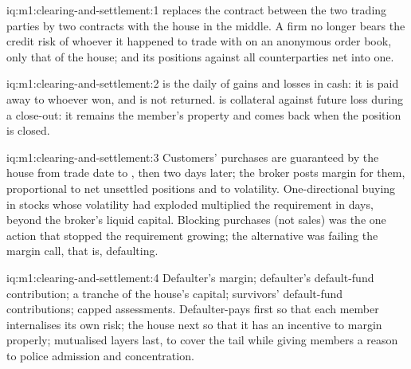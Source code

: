 \begin{solution}{iq:m1:clearing-and-settlement:1}
 replaces the contract between the two trading parties by two
contracts with the  house in the middle. A firm no longer bears the
credit risk of whoever it happened to trade with on an anonymous order book,
only that of the  house; and its positions against all
counterparties net into one.
\end{solution}

\begin{solution}{iq:m1:clearing-and-settlement:2}
 is the daily  of gains and losses in cash: it is
paid away to whoever won, and is not returned.  is collateral
against future loss during a close-out: it remains the member's property and
comes back when the position is closed.
\end{solution}

\begin{solution}{iq:m1:clearing-and-settlement:3}
Customers' purchases are guaranteed by the  house from trade date to
, then two days later; the broker posts margin for them,
proportional to net unsettled positions and to volatility. One-directional
buying in stocks whose volatility had exploded multiplied the requirement in
days, beyond the broker's liquid capital. Blocking purchases (not sales) was
the one action that stopped the requirement growing; the alternative was
failing the margin call, that is, defaulting.
\end{solution}

\begin{solution}{iq:m1:clearing-and-settlement:4}
Defaulter's margin; defaulter's default-fund contribution; a tranche of the
 house's capital; survivors' default-fund contributions; capped
assessments. Defaulter-pays first so that each member internalises its own
risk; the  house next so that it has an incentive to margin
properly; mutualised layers last, to cover the tail while giving members a
reason to police admission and concentration.
\end{solution}

